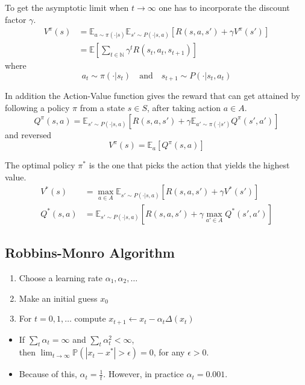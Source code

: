 To get the asymptotic limit when $t \to \infty$ one has to incorporate the discount factor $\gamma$.
\begin{align*}
    V^{\pi}(s) & = \mathbb{E}_{a \sim \pi(\cdot|s)} \mathbb{E}_{s' \sim P(\cdot|s, a)} \left[R(s,a,s') + \gamma V^{\pi}(s')\right] \\
               & = \mathbb{E}\left[\sum_{t\in \mathbb{N}}\gamma^t R(s_t,a_t,s_{t+1})\right]
\end{align*}
where
\begin{equation*}
    a_t \sim \pi(\cdot | s_t) \quad \text{and} \quad s_{t+1}\sim P(\cdot | s_t,a_t)
\end{equation*}

In addition the Action-Value function gives the reward that can get attained by following a policy $\pi$ from a state $s \in S$,
after taking action $a \in A$.
\begin{equation*}
    Q^\pi(s,a) = \mathbb{E}_{s' \sim P(\cdot|s,a)}\left[R(s,a,s')+\gamma \mathbb{E}_{a'\sim \pi(\cdot|s')} Q^\pi(s',a')\right]
\end{equation*}
and reversed
\begin{equation*}
    V^\pi(s) = \mathbb{E}_a \left[ Q^\pi (s,a)\right]
\end{equation*}

\newpar{}

The optimal policy $\pi^*$ is the one that picks the action that yields the highest value.
\begin{align*}
    V^*(s)   & = \max_{a\in A}\mathbb{E}_{s'\sim P(\cdot|s,a)}\left[R(s,a,s')+\gamma V^* (s')\right]       \\
    Q^*(s,a) & = \mathbb{E}_{s'\sim P(\cdot|s,a)}\left[R(s,a,s') + \gamma \max_{a'\in A}Q^* (s',a')\right]
\end{align*}

\subsection{Robbins-Monro Algorithm}

\begin{enumerate}
    \item Choose a learning rate $\alpha_1, \alpha_2, \ldots$
    \item Make an initial guess $x_0$
    \item For $t={0,1,\ldots}$ compute $x_{t+1} \leftarrow x_t - \alpha_t \Delta(x_t)$
\end{enumerate}

\newpar{}
\begin{itemize}
    \item If $\sum_{t}\alpha_t = \infty$ and $\sum_{t}\alpha^2_t<\infty$, \\ then $\lim_{t\to\infty}\mathbb{P}(|x_t - x^*|>\epsilon) = 0$, for any $\epsilon > 0$.
    \item Because of this, $\alpha_t = \frac{1}{t}$. However, in practice $\alpha_t = 0.001$.
\end{itemize}

